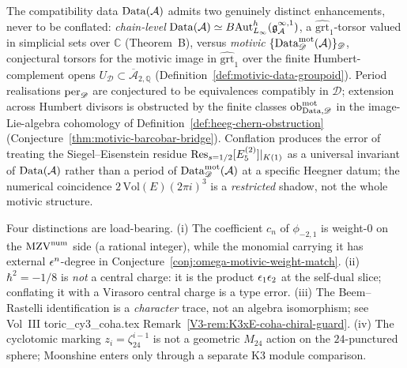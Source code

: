 \begin{remark}
\label{rem:motivic-vs-chainlevel-data}
The compatibility data $\mathrm{Data}(\mathcal{A})$ admits two genuinely distinct
enhancements, never to be conflated:
\emph{chain-level} $\mathrm{Data}(\mathcal{A})\simeq
B\mathrm{Aut}^h_{L_\infty}(\mathfrak g^{\infty,1}_{\mathcal{A}})$, a
$\widehat{\mathrm{grt}}_1$-torsor valued in simplicial sets over
$\mathbb C$ (Theorem~B), versus \emph{motivic}
$\{\mathrm{Data}^{\mathrm{mot}}_{\mathscr D}(\mathcal{A})\}_{\mathscr D}$, conjectural torsors
for the motivic image in $\widehat{\mathrm{grt}}_1$ over the finite
Humbert-complement opens
$U_{\mathscr D}\subset\overline{\mathcal A}_{2,\mathbb Q}$
(Definition~\ref{def:motivic-data-groupoid}). Period realisations
$\mathrm{per}_{\mathscr D}$ are conjectured to be equivalences compatibly in
$\mathscr D$; extension across Humbert divisors is obstructed by the
finite classes $\mathrm{ob}^{\mathrm{mot}}_{\mathrm{Data},\mathscr D}$ in the
image-Lie-algebra cohomology of
Definition~\ref{def:heeg-chern-obstruction}
(Conjecture~\ref{thm:motivic-barcobar-bridge}). Conflation produces
the error of treating the Siegel--Eisenstein residue
$\operatorname{Res}_{s=1/2}[E_5^{(2)}]|_{K(1)}$ as a universal invariant of
$\mathrm{Data}(\mathcal{A})$ rather than a period of
$\mathrm{Data}^{\mathrm{mot}}_{\mathscr D}(\mathcal{A})$ at a specific Heegner datum; the numerical
coincidence $2\,\mathrm{Vol}(E)(2\pi i)^3$ is a \emph{restricted}
shadow, not the whole motivic structure.
\end{remark}


\begin{remark}
\label{rem:mst-nekrasov-scope}
Four distinctions are load-bearing. (i) The coefficient
$c_n$ of $\phi_{-2,1}$ is weight-$0$ on the $\mathrm{MZV}^{\mathrm{num}}$ side
(a rational integer), while the monomial carrying it has external
$\epsilon^n$-degree in Conjecture~\ref{conj:omega-motivic-weight-match}.
(ii) $\hbar^2 = -1/8$ is \emph{not} a central charge:
it is the product $\epsilon_1\epsilon_2$ at the self-dual slice; conflating
it with a Virasoro central charge is a type error. (iii) The Beem--Rastelli
identification is a \emph{character} trace, not an algebra
isomorphism; see Vol~III toric\_cy3\_coha.tex
Remark~\ref{V3-rem:K3xE-coha-chiral-guard}. (iv) The cyclotomic
marking $z_i=\zeta_{24}^{i-1}$ is not a geometric $M_{24}$ action on
the $24$-punctured sphere; Moonshine enters only through a separate K3
module comparison.
\end{remark}


